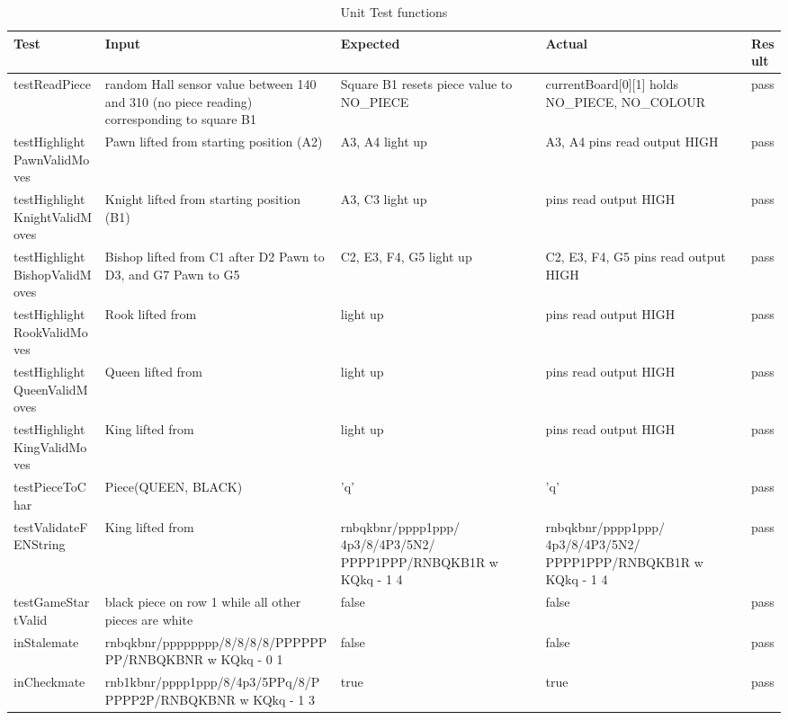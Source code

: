 \documentclass[12pt, titlepage]{article}
\begin{document}
\begin{table}[H]
  \centering
    \setlength{\leftmargini}{0cm}
    \begin{tabular}{| >{\centering\arraybackslash}m{6cm} | 
        >{\centering\arraybackslash}m{4cm} | 
        >{\centering\arraybackslash}m{3.5cm} | 
        >{\centering\arraybackslash}m{3.5cm} |
        >{\centering\arraybackslash}m{1.5cm} |}
    \hline
    \rowcolor[gray]{0.9}
    Test & Input & Expected & Actual & Result\\
    \hline
    testReadPiece & random Hall sensor value between 140 and 310 (no piece reading) corresponding to square B1 & Square B1 resets piece value to NO\_PIECE & currentBoard[0][1] holds NO\_PIECE, NO\_COLOUR  & pass \\
    \hline
    testHighlightPawnValidMoves & Pawn lifted from starting position (A2) & A3, A4 light up & A3, A4 pins read output HIGH & pass \\
    \hline
    testHighlightKnightValidMoves & Knight lifted from starting position (B1)& A3, C3 light up & pins read output HIGH & pass \\
    \hline
    testHighlightBishopValidMoves & Bishop lifted from C1 after D2 Pawn to D3, and G7 Pawn to G5 & C2, E3, F4, G5 light up & C2, E3, F4, G5 pins read output HIGH & pass \\
    \hline
    testHighlightRookValidMoves & Rook lifted from & light up & pins read output HIGH & pass \\
    \hline
    testHighlightQueenValidMoves & Queen lifted from & light up & pins read output HIGH & pass \\
    \hline
    testHighlightKingValidMoves & King lifted from & light up & pins read output HIGH & pass \\
    \hline
    testPieceToChar & Piece(QUEEN, BLACK) & 'q' & 'q' & pass \\
    \hline
    testValidateFENString & King lifted from & {\scriptsize rnbqkbnr/pppp1ppp/ 4p3/8/4P3/5N2/ PPPP1PPP/RNBQKB1R w KQkq - 1 4} & {\scriptsize rnbqkbnr/pppp1ppp/ 4p3/8/4P3/5N2/ PPPP1PPP/RNBQKB1R w KQkq - 1 4} & pass \\
    \hline
    testGameStartValid & black piece on row 1 while all other pieces are white & false & false & pass \\
    \hline
    inStalemate & rnbqkbnr/\-pppppppp\-/8/8/8/8/\-PPPPPPPP/\-RNBQKBNR w KQkq - 0 1 & false & false & pass \\
    \hline 
    inCheckmate & rnb1kbnr/\-pppp1ppp\-/8/4p3\-/5PPq/8/\-PPPPP2P/\-RNBQKBNR \-w KQkq - 1 3 & true & true & pass \\
    \hline
    \end{tabular}
  \caption{Unit Test functions}
\end{table}
\restoregeometry
\end{document}
